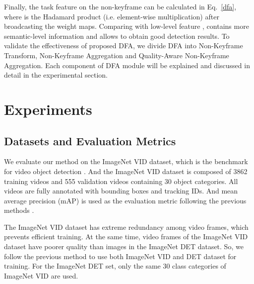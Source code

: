 \documentclass[runningheads]{llncs}
\begin{document}
Finally, the task feature  on the non-keyframe  can be calculated in Eq.~\ref{dfa}, where  is the Hadamard product (i.e. element-wise multiplication) after broadcasting the weight maps. Comparing with low-level feature ,  contains more semantic-level information and allows to obtain good detection results. To validate the effectiveness of proposed DFA, we divide DFA into Non-Keyframe Transform, Non-Keyframe Aggregation and Quality-Aware  Non-Keyframe  Aggregation. Each component of DFA module will be explained and discussed in detail in the experimental section.


\section{Experiments}
\subsection{Datasets and Evaluation Metrics}
We evaluate our method on the ImageNet VID dataset, which is the benchmark for video object detection \cite{russakovsky2015imagenet}. And the ImageNet VID dataset is composed of 3862 training videos and 555 validation videos containing 30 object categories. All videos are fully annotated with bounding boxes and tracking IDs. And mean average precision (mAP) is used as the evaluation metric following the previous methods \cite{zhu2017deep}.

The ImageNet VID dataset has extreme redundancy among video frames, which prevents efficient training. At the same time, video frames of the ImageNet VID dataset have poorer quality than images in the ImageNet DET \cite{russakovsky2015imagenet} dataset. So, we follow the previous method \cite{zhu2018towards} to use both ImageNet VID and DET dataset for training. For the ImageNet DET set, only the same 30 class categories of ImageNet VID are used.
\end{document}
